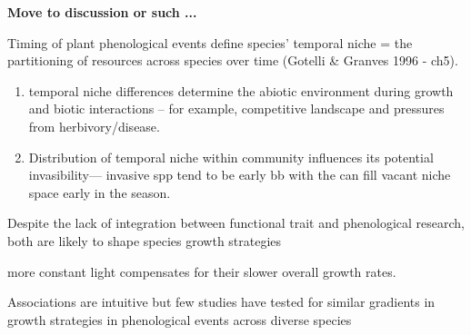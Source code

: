 \documentclass{article}
\begin{document}

{\bf Move to discussion or such ...}
\item Timing of plant phenological events define species' temporal niche = the partitioning of resources across species over time (Gotelli \& Granves 1996 - ch5). %
\begin{enumerate} 
\item temporal niche differences determine the abiotic environment during growth and biotic interactions -- for example, competitive landscape and pressures from herbivory/disease. %
\item Distribution of temporal niche within community influences its potential invasibility--- invasive spp tend to be early bb with the can fill vacant niche space early in the season. 
\end{enumerate}


Despite the lack of integration between functional trait and phenological research, both are likely to shape species growth strategies

more constant light compensates for their slower overall growth rates.  %

Associations are intuitive but few studies have tested for similar gradients in growth strategies in phenological events across diverse species
\end{document}
